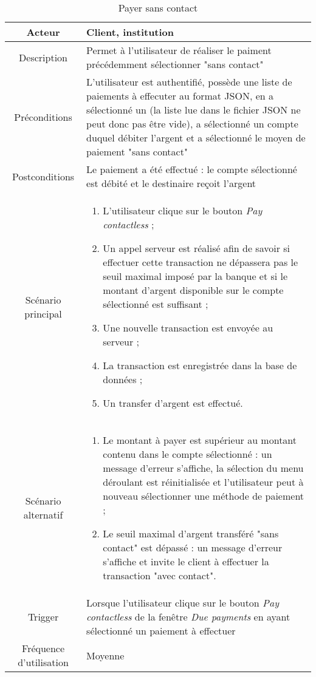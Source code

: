 \documentclass{article}
\begin{document}
\begin{table}

\begin{tabular}{|c|p{11cm}|}
\hline
Acteur & Client, institution \\
\hline
Description & Permet à l'utilisateur de réaliser le paiment précédemment sélectionner "sans contact" \\
\hline
Préconditions & L'utilisateur est authentifié, possède une liste de paiements à effecuter au format JSON, en a sélectionné un (la liste lue dans le fichier JSON ne peut donc pas être vide), a sélectionné un compte duquel débiter l'argent et a sélectionné le moyen de paiement "sans contact" \\
\hline
Postconditions & Le paiement a été effectué : le compte sélectionné est débité et le destinaire reçoit l'argent \\
\hline
Scénario principal & \begin{enumerate}
\item L'utilisateur clique sur le bouton \emph{Pay contactless} ;
\item Un appel serveur est réalisé afin de savoir si effectuer cette transaction ne dépassera pas le seuil maximal imposé par la banque et si le montant d'argent disponible sur le compte sélectionné est suffisant ;
\item Une nouvelle transaction est envoyée au serveur ;
\item La transaction est enregistrée dans la base de données ;
\item Un transfer d'argent est effectué.
\end{enumerate} \\
\hline
Scénario alternatif & \begin{enumerate}
\item Le montant à payer est supérieur au montant contenu dans le compte sélectionné : un message d'erreur s'affiche, la sélection du menu déroulant est réinitialisée et l'utilisateur peut à nouveau sélectionner une méthode de paiement ;
\item Le seuil maximal d'argent transféré "sans contact" est dépassé : un message d'erreur s'affiche et invite le client à effectuer la transaction "avec contact".
\end{enumerate} \\
\hline
Trigger & Lorsque l'utilisateur clique sur le bouton \emph{Pay contactless} de la fenêtre \emph{Due payments} en ayant sélectionné un paiement à effectuer \\
\hline
Fréquence d'utilisation & Moyenne \\
\hline
\end{tabular}

\caption{Payer sans contact}

\end{table}
\end{document}
